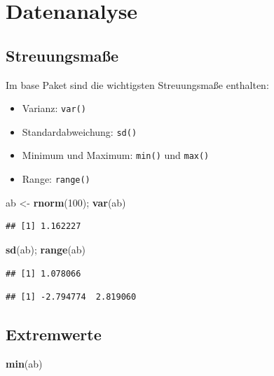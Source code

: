 \documentclass[]{article}
\newenvironment{Shaded}{\begin{snugshade}}{\end{snugshade}}
\newcommand{\KeywordTok}[1]{\textcolor[rgb]{0.13,0.29,0.53}{\textbf{{#1}}}}
\newcommand{\DecValTok}[1]{\textcolor[rgb]{0.00,0.00,0.81}{{#1}}}
\newcommand{\StringTok}[1]{\textcolor[rgb]{0.31,0.60,0.02}{{#1}}}
\newcommand{\NormalTok}[1]{{#1}}
\providecommand{\tightlist}{%
  \setlength{\itemsep}{0pt}\setlength{\parskip}{0pt}}
\begin{document}
\section{Datenanalyse}\label{datenanalyse}

\subsection{Streuungsmaße}\label{streuungsmae}

Im base Paket sind die wichtigsten Streuungsmaße enthalten:

\begin{itemize}
\tightlist
\item
  Varianz: \texttt{var()}
\item
  Standardabweichung: \texttt{sd()}
\item
  Minimum und Maximum: \texttt{min()} und \texttt{max()}
\item
  Range: \texttt{range()}
\end{itemize}

\begin{Shaded}
\begin{Highlighting}[]
\NormalTok{ab <-}\StringTok{ }\KeywordTok{rnorm}\NormalTok{(}\DecValTok{100}\NormalTok{); }\KeywordTok{var}\NormalTok{(ab)}
\end{Highlighting}
\end{Shaded}

\begin{verbatim}
## [1] 1.162227
\end{verbatim}

\begin{Shaded}
\begin{Highlighting}[]
\KeywordTok{sd}\NormalTok{(ab); }\KeywordTok{range}\NormalTok{(ab)}
\end{Highlighting}
\end{Shaded}

\begin{verbatim}
## [1] 1.078066
\end{verbatim}

\begin{verbatim}
## [1] -2.794774  2.819060
\end{verbatim}

\subsection{Extremwerte}\label{extremwerte}

\begin{Shaded}
\begin{Highlighting}[]
\KeywordTok{min}\NormalTok{(ab)}
\end{Highlighting}
\end{Shaded}
\end{document}
